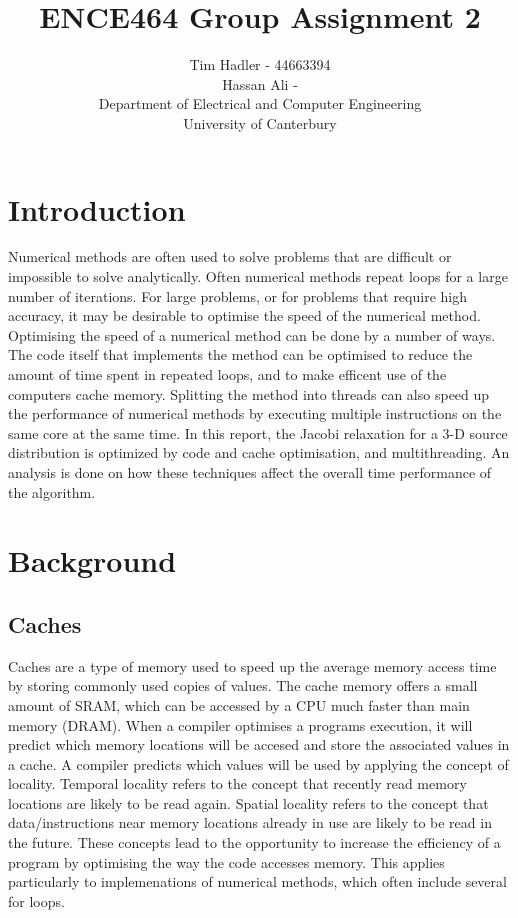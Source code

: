 \documentclass[a4paper, 12pt]{article}
\title{\vspace{-1cm} ENCE464 Group Assignment 2}
\author{Tim Hadler - 44663394 \\ Hassan Ali -  \\
	\small Department of Electrical and Computer Engineering\\
	\small University of Canterbury}
\begin{document}
\maketitle
\pagebreak
	
\section{Introduction}
	Numerical methods are often used to solve problems that are difficult or impossible to solve analytically. Often numerical methods repeat loops for a large number of iterations. For large problems, or for problems that require high accuracy, it may be desirable to optimise the speed of the numerical method. Optimising the speed of a numerical method can be done by a number of ways. The code itself that implements the method can be optimised to reduce the amount of time spent in repeated loops, and to make efficent use of the computers cache memory. Splitting the method into threads can also speed up the performance of numerical methods by executing multiple instructions on the same core at the same time. In this report, the Jacobi relaxation for a 3-D source distribution is optimized by code and cache optimisation, and multithreading. An analysis is done on how these techniques affect the overall time performance of the algorithm. 
	

\section{Background}

\subsection{Caches}
Caches are a type of memory used to speed up the average memory access time by storing commonly used copies of values. The cache memory offers a small amount of SRAM, which can be accessed by a CPU much faster than main memory (DRAM). When a compiler optimises a programs execution, it will predict which memory locations will be accesed and store the associated values in a cache. A compiler predicts which values will be used by applying the concept of locality. Temporal locality refers to the concept that recently read memory locations are likely to be read again. Spatial locality refers to the concept that data/instructions near memory locations already in use are likely to be read in the future. These concepts lead to the opportunity to increase the efficiency of a program by optimising the way the code accesses memory. This applies particularly to implemenations of numerical methods, which often include several for loops. 
\end{document}
